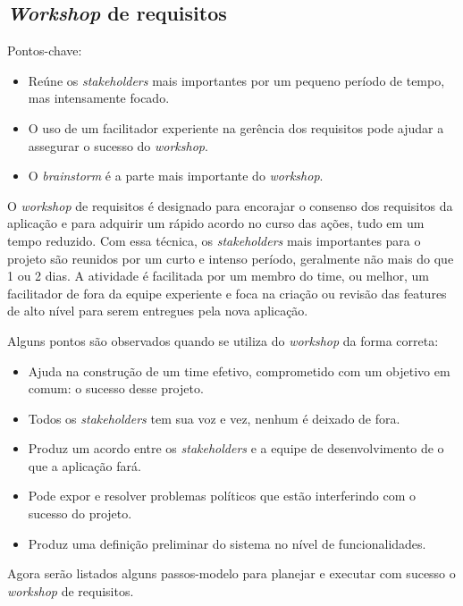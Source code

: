     \subsection{\textit{Workshop} de requisitos}
    
      Pontos-chave:
      \begin{itemize}
       \item Reúne os \textit{stakeholders} mais importantes por um pequeno período de tempo, mas intensamente focado.
       \item O uso de um facilitador experiente na gerência dos requisitos pode ajudar a assegurar o sucesso do \textit{workshop}.
       \item O \textit{brainstorm} é a parte mais importante do \textit{workshop}.
      \end{itemize}
      
      O \textit{workshop} de requisitos é designado para encorajar o consenso dos requisitos da aplicação 
      e para adquirir um rápido acordo no curso das ações, 
      tudo em um tempo reduzido. Com essa técnica, os \textit{stakeholders} mais importantes para o projeto são 
      reunidos por um curto e intenso período, geralmente não mais do que 1 ou 2 dias. 
      A atividade é facilitada por um membro do time, ou melhor, 
      um facilitador de fora da equipe experiente e foca na criação ou revisão das features de alto nível 
      para serem entregues pela nova aplicação.
      
      Alguns pontos são observados quando se utiliza do \textit{workshop} da forma correta:
      \begin{itemize}
       \item Ajuda na construção de um time efetivo, comprometido com um objetivo em comum: o sucesso desse projeto.
       \item Todos os \textit{stakeholders} tem sua voz e vez, nenhum é deixado de fora.
       \item Produz um acordo entre os \textit{stakeholders} e a equipe de desenvolvimento de o que a aplicação fará.
       \item Pode expor e resolver problemas políticos que estão interferindo com o sucesso do projeto.
       \item Produz uma definição preliminar do sistema no nível de funcionalidades.
      \end{itemize}
      
      Agora serão listados alguns passos-modelo para planejar e executar com sucesso o \textit{workshop} de requisitos.
